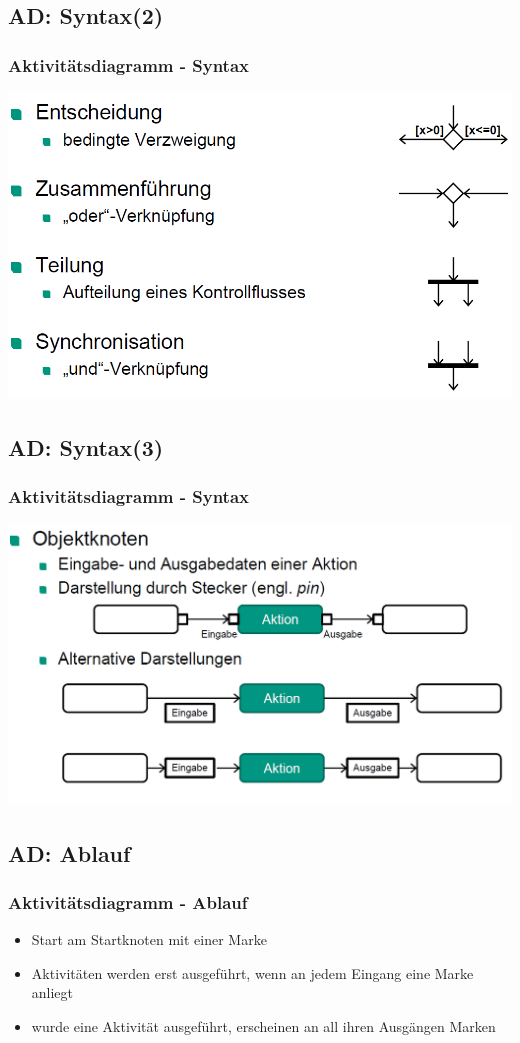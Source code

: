 \documentclass[18pt]{beamer}
\begin{document}
	\subsection{AD: Syntax(2)}
	\begin{frame}
		\frametitle{Aktivitätsdiagramm - Syntax}
		\includegraphics[scale=0.45]{./pics/tut2/act_syn2.png}
	\end{frame}

	\subsection{AD: Syntax(3)}
	\begin{frame}
		\frametitle{Aktivitätsdiagramm - Syntax}
		\includegraphics[scale=0.45]{./pics/tut2/act_syn3.png}
	\end{frame}

	\subsection{AD: Ablauf}
	\begin{frame}
		\frametitle{Aktivitätsdiagramm - Ablauf}
		\begin{itemize}
			\item Start am Startknoten mit einer Marke
			\item Aktivitäten werden erst ausgeführt, wenn an jedem Eingang eine Marke anliegt
			\item wurde eine Aktivität ausgeführt, erscheinen an all ihren Ausgängen Marken
		\end{itemize}
	\end{frame}
\end{document}
